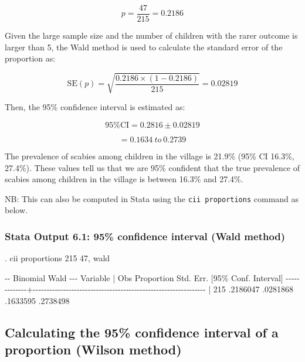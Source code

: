 \documentclass[
]{memoir}
\newenvironment{Shaded}{\begin{snugshade}}{\end{snugshade}}
\newcommand{\NormalTok}[1]{#1}
\begin{document}
\[ p = \frac{47}{215} = 0.2186 \]

Given the large sample size and the number of children with the rarer outcome is larger than 5, the Wald method is used to calculate the standard error of the proportion as:

\[{\text{SE}\left( p \right) = \sqrt{\frac{0.2186 \times (1 - 0.2186)}{215}}
}{= 0.02819}\]

Then, the 95\% confidence interval is estimated as:

\[\text{95\% CI} = 0.2816 \pm 0.02819\]

\[= 0.1634\ to\ 0.2739\]

The prevalence of scabies among children in the village is 21.9\% (95\% CI 16.3\%, 27.4\%). These values tell us that we are 95\% confident that the true prevalence of scabies among children in the village is between 16.3\% and 27.4\%.

NB: This can also be computed in Stata using the \texttt{cii\ proportions} command as below.

\hypertarget{stata-output-6.1-95-confidence-interval-wald-method}{%
\subsubsection*{Stata Output 6.1: 95\% confidence interval (Wald method)}\label{stata-output-6.1-95-confidence-interval-wald-method}}

\begin{Shaded}
\begin{Highlighting}[]
\NormalTok{. cii proportions 215 47, wald}

\NormalTok{                                                         {-}{-} Binomial Wald {-}{-}{-}}
\NormalTok{    Variable |        Obs  Proportion    Std. Err.       [95\% Conf. Interval]}
\NormalTok{{-}{-}{-}{-}{-}{-}{-}{-}{-}{-}{-}{-}{-}+{-}{-}{-}{-}{-}{-}{-}{-}{-}{-}{-}{-}{-}{-}{-}{-}{-}{-}{-}{-}{-}{-}{-}{-}{-}{-}{-}{-}{-}{-}{-}{-}{-}{-}{-}{-}{-}{-}{-}{-}{-}{-}{-}{-}{-}{-}{-}{-}{-}{-}{-}{-}{-}{-}{-}{-}{-}{-}{-}{-}{-}{-}{-}}
\NormalTok{             |        215    .2186047    .0281868        .1633595    .2738498}
\end{Highlighting}
\end{Shaded}

\hypertarget{calculating-the-95-confidence-interval-of-a-proportion-wilson-method}{%
\subsection{Calculating the 95\% confidence interval of a proportion (Wilson method)}\label{calculating-the-95-confidence-interval-of-a-proportion-wilson-method}}
\end{document}
